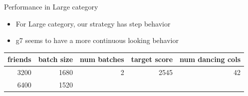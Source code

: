 \begin{frame}{Performance in Large category}

\begin{itemize}
\tightlist
\item
  For Large category, our strategy has step behavior
\item
  g7 seems to have a more continuous looking behavior 
\end{itemize}

\begin{longtable}[c]{@{}rrrrr@{}}
\toprule
\begin{minipage}[b]{0.12\columnwidth}\raggedleft\strut
friends
\strut\end{minipage} &
\begin{minipage}[b]{0.16\columnwidth}\raggedleft\strut
batch size
\strut\end{minipage} &
\begin{minipage}[b]{0.17\columnwidth}\raggedleft\strut
num batches
\strut\end{minipage} &
\begin{minipage}[b]{0.18\columnwidth}\raggedleft\strut
target score
\strut\end{minipage} &
\begin{minipage}[b]{0.23\columnwidth}\raggedleft\strut
num dancing cols
\strut\end{minipage}\tabularnewline
\midrule
\endhead
\begin{minipage}[t]{0.12\columnwidth}\raggedleft\strut
3200
\strut\end{minipage} &
\begin{minipage}[t]{0.16\columnwidth}\raggedleft\strut
1680
\strut\end{minipage} &
\begin{minipage}[t]{0.17\columnwidth}\raggedleft\strut
2
\strut\end{minipage} &
\begin{minipage}[t]{0.18\columnwidth}\raggedleft\strut
2545
\strut\end{minipage} &
\begin{minipage}[t]{0.23\columnwidth}\raggedleft\strut
42
\strut\end{minipage}\tabularnewline
\begin{minipage}[t]{0.12\columnwidth}\raggedleft\strut
6400
\strut\end{minipage} &
\begin{minipage}[t]{0.16\columnwidth}\raggedleft\strut
1520
\strut\end{minipage} &

\end{longtable}
\end{frame}
